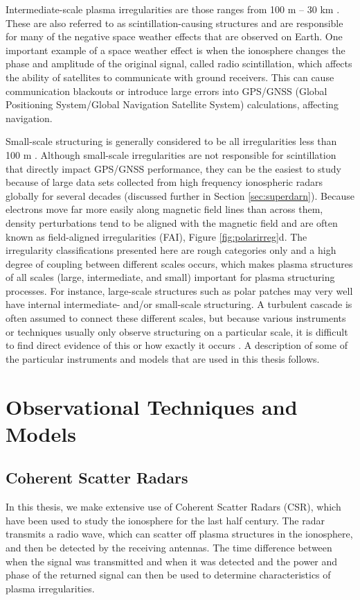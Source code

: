 Intermediate-scale plasma irregularities are those ranges from 100 m -- 30 km \citep{Kelley2009}.  These are also referred to as scintillation-causing structures and are responsible for many of the negative space weather effects that are observed on Earth.  One important example of a space weather effect is when the ionosphere changes the phase and amplitude of the original signal, called radio scintillation, which affects the ability of satellites to communicate with ground receivers.  This can cause communication blackouts or introduce large errors into GPS/GNSS (Global Positioning System/Global Navigation Satellite System) calculations, affecting navigation.

Small-scale structuring is generally considered to be all irregularities less than 100 m \citep{Kelley2009}.  Although small-scale irregularities are not responsible for scintillation that directly impact GPS/GNSS performance, they can be the easiest to study because of large data sets collected from high frequency ionospheric radars globally for several decades (discussed further in Section \ref{sec:superdarn}).  Because electrons move far more easily along magnetic field lines than across them, density perturbations tend to be aligned with the magnetic field and are often known as field-aligned irregularities (FAI), Figure \ref{fig:polarirreg}d.  The irregularity classifications presented here are rough categories only and a high degree of coupling between different scales occurs, which makes plasma structures of all scales (large, intermediate, and small) important for plasma structuring processes.  For instance, large-scale structures such as polar patches may very well have internal intermediate- and/or small-scale structuring.  A turbulent cascade is often assumed to connect these different scales, but because various instruments or techniques usually only observe structuring on a particular scale, it is difficult to find direct evidence of this or how exactly it occurs \citep{Kintner1985,Tsunoda1985}.  A description of some of the particular instruments and models that are used in this thesis follows.

\section{Observational Techniques and Models}

\subsection{Coherent Scatter Radars}
\label{sec:csr}
In this thesis, we make extensive use of Coherent Scatter Radars (CSR), which have been used to study the ionosphere for the last half century.  The radar transmits a radio wave, which can scatter off plasma structures in the ionosphere, and then be detected by the receiving antennas.  The time difference between when the signal was transmitted and when it was detected and the power and phase of the returned signal can then be used to determine characteristics of plasma irregularities.


